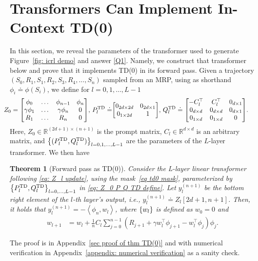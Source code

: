 \documentclass{article}
\newcommand{\R}{\mathbb{R}}
\newcommand{\indot}[2]{{\left<#1, #2\right>}}
\newcommand{\td}{\text{TD}}
\newtheorem{theorem}{Theorem}
\begin{document}
\section{Transformers Can Implement In-Context TD(0)} \label{sec: td0}
In this section,
we reveal the parameters of the transformer used to generate Figure~\ref{fig: icrl demo}
and answer \ref{Q1}.
Namely,
we construct that transformer below and prove that it implements TD(0) in its forward pass.
Given a trajectory $(S_0, R_1, S_1, R_2, S_3, R_4, \dots, S_n)$ sampled from an MRP,
using as shorthand $\phi_i \doteq \phi(S_i)$,
we define for $l = 0, 1, \dots, L-1$
\begin{align}
    \!\!\!\!\!\! Z_0 = \mqty[\phi_0 & \dots & \phi_{n-1} & \phi_n \\ \gamma \phi_1 & \dots & \gamma \phi_n & 0 \\ R_1 & \dots & R_n & 0], \, P_l^{\td} \doteq& \mqty[0_{2d \times 2d} & 0_{2d \times 1} \\ 0_{1 \times 2d} & 1], \,    Q_l^{\td} \doteq \mqty[-C_l^\top & C_l^\top & 0_{d \times 1} \\ 0_{d \times d} & 0_{d \times d} & 0_{d \times 1} \\ 0_{1 \times d} & 0_{1 \times d} & 0].
     \label{eq: Z_0 P Q TD define}
\end{align}
Here, $Z_0 \in \R^{(2d+1) \times (n+1)}$ is the prompt matrix,
$C_l \in \R^{d \times d}$ is an arbitrary matrix,
and $\qty{(P_l^\td, Q_l^\td)}_{l=0,1,\dots, L-1}$ are the parameters of the $L$-layer transformer.
We then have
\begin{theorem}[Forward pass as TD(0)]
\label{thm: TD(0)}
    Consider the L-layer linear transformer following \eqref{eq: Z_l update}, using the mask~\eqref{eq td0 mask}, parameterized by $\qty{P_l^{\td}, Q_l^{\td}}_{l=0,\dots, L-1}$ in \eqref{eq: Z_0 P Q TD define}.
    Let $y_l^{(n+1)}$ be the bottom right element of the $l$-th layer's output, i.e.,  $y_l^{(n+1)} \doteq Z_l[2d+1, n+1]$.
    Then, it holds that $y_l^{(n+1)} =  - \indot{\phi_n}{w_l}$,
    where $\qty{w_l}$ is defined as $w_0 = 0$ and
    \begin{align}
     w_{l+1} &\textstyle = w_l + \frac{1}{n} C_l \sum_{j=0}^{n-1}  \left(R_{j+1} + \gamma w_l^\top\phi_{j+1} - w_l^\top\phi_j\right)\phi_j. \label{eq: TD(0) w_update}
    \end{align}
\end{theorem}
The proof is in Appendix~\ref{sec proof of thm TD(0)} and with numerical verification in Appendix~\ref{appendix: numerical verification} as a sanity check.
\end{document}
